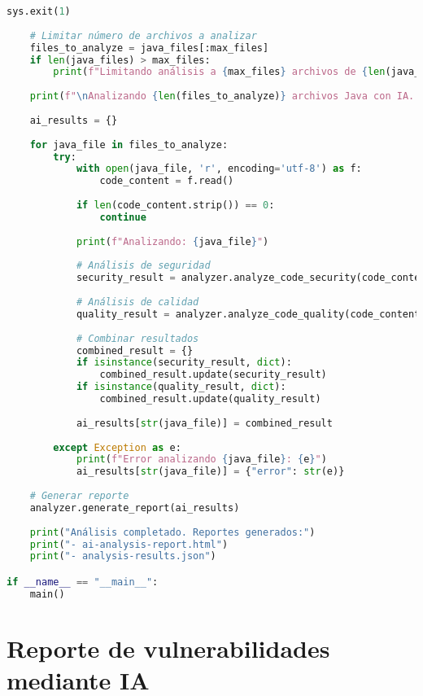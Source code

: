 \begin{lstlisting}[language=python, caption={Contenido completo del script ai\_analyzer.py.}, label={lst:python_script}]
        sys.exit(1)
    
    # Limitar número de archivos a analizar
    files_to_analyze = java_files[:max_files]
    if len(java_files) > max_files:
        print(f"Limitando análisis a {max_files} archivos de {len(java_files)} encontrados")
    
    print(f"\nAnalizando {len(files_to_analyze)} archivos Java con IA...")
    
    ai_results = {}
    
    for java_file in files_to_analyze:
        try:
            with open(java_file, 'r', encoding='utf-8') as f:
                code_content = f.read()
                
            if len(code_content.strip()) == 0:
                continue
                
            print(f"Analizando: {java_file}")
            
            # Análisis de seguridad
            security_result = analyzer.analyze_code_security(code_content, str(java_file))
            
            # Análisis de calidad
            quality_result = analyzer.analyze_code_quality(code_content, str(java_file))
            
            # Combinar resultados
            combined_result = {}
            if isinstance(security_result, dict):
                combined_result.update(security_result)
            if isinstance(quality_result, dict):
                combined_result.update(quality_result)
            
            ai_results[str(java_file)] = combined_result
            
        except Exception as e:
            print(f"Error analizando {java_file}: {e}")
            ai_results[str(java_file)] = {"error": str(e)}
    
    # Generar reporte
    analyzer.generate_report(ai_results)
    
    print("Análisis completado. Reportes generados:")
    print("- ai-analysis-report.html")
    print("- analysis-results.json")

if __name__ == "__main__":
    main()
\end{lstlisting}


\chapter{Reporte de vulnerabilidades mediante IA}
\label{anexo:ai-analysis-report}

\thispagestyle{plain}

